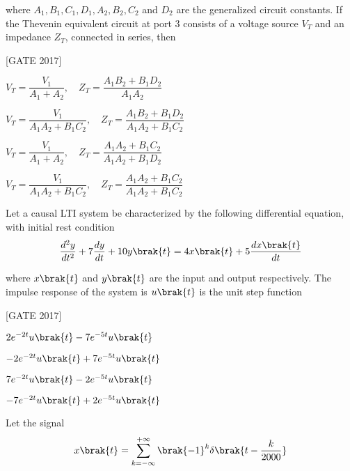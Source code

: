 where  $A_1, B_1, C_1, D_1, A_2, B_2, C_2$ and $ D_2$ are the generalized circuit constants. If the Thevenin equivalent circuit at port 3 consists of a voltage source  $V_T$ and an impedance $ Z_T$, connected in series, then

\hfill{[GATE 2017]} \begin{enumerate}
    \begin{multicols}{2}
        \item  $V_T = \dfrac{V_1}{A_1 + A_2}, \quad Z_T = \dfrac{A_1 B_2 + B_1 D_2}{A_1 A_2}$\\
        \item  $V_T = \dfrac{V_1}{A_1 A_2 + B_1 C_2}, \quad Z_T = \dfrac{A_1 B_2 + B_1 D_2}{A_1 A_2 + B_1 C_2} $
        \item$ V_T = \dfrac{V_1}{A_1 + A_2}, \quad Z_T = \dfrac{A_1 A_2 + B_1 C_2}{A_1 A_2 + B_1 D_2}$\\
        \item $ V_T = \dfrac{V_1}{A_1 A_2 + B_1 C_2}, \quad Z_T = \dfrac{A_1 A_2 + B_1 C_2}{A_1 A_2 + B_1 C_2}$
    \end{multicols}
\end{enumerate}

\item Let a causal LTI system be characterized by the following differential equation, with initial rest condition
\begin{align*}
   \frac{d^2 y}{dt^2} + 7 \frac{dy}{dt} + 10 y\brak{t} = 4x\brak{t} + 5 \frac{dx\brak{t}}{dt} 
\end{align*}

where $x\brak{t}$ and  $y\brak{t}$ are the input and output respectively. The impulse response of the system is $ u\brak{t}$ is the unit step function

\hfill{[GATE 2017]} \begin{enumerate}
    \begin{multicols}{2}
        \item  $2e^{-2t} u\brak{t} - 7e^{-5t} u\brak{t} $
        \item  $-2e^{-2t} u\brak{t} + 7e^{-5t} u\brak{t} $
        \item $ 7e^{-2t} u\brak{t} - 2e^{-5t} u\brak{t} $
        \item $-7e^{-2t} u\brak{t} + 2e^{-5t} u\brak{t} $
    \end{multicols}
\end{enumerate}
\item Let the signal
\begin{align*}
  x\brak{t} = \sum_{k=-\infty}^{+\infty} \brak{-1}^k \delta \brak{ t - \frac{k}{2000} }
\end{align*}

